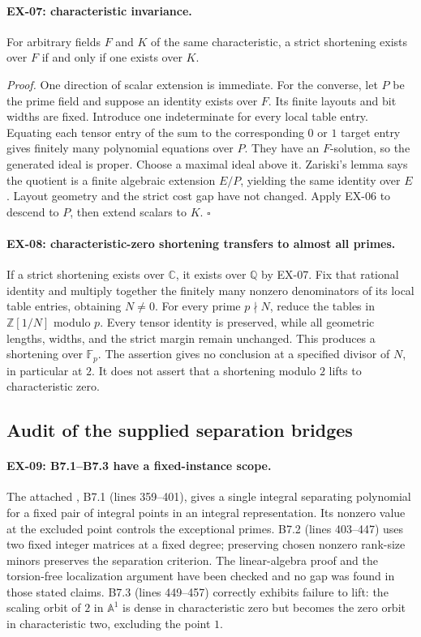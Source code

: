 \paragraph{EX-07: characteristic invariance.}
For arbitrary fields $F$ and $K$ of the same characteristic, a strict shortening
exists over $F$ if and only if one exists over $K$.

\emph{Proof.}
One direction of scalar extension is immediate.  For the converse, let $P$ be
the prime field and suppose an identity exists over $F$.  Its finite layouts
and bit widths are fixed.  Introduce one indeterminate for every local table
entry.  Equating each tensor entry of the sum to the corresponding $0$ or $1$
target entry gives finitely many polynomial equations over $P$.  They have an
$F$-solution, so the generated ideal is proper.  Choose a maximal ideal above
it.  Zariski's lemma says the quotient is a finite algebraic extension $E/P$,
yielding the same identity over $E$.  Layout geometry and the strict cost gap
have not changed.  Apply EX-06 to descend to $P$, then extend scalars to $K$.
\hfill$\square$

\paragraph{EX-08: characteristic-zero shortening transfers to almost all
primes.}
If a strict shortening exists over $\mathbb C$, it exists over $\mathbb Q$ by
EX-07.  Fix that rational identity and multiply together the finitely many
nonzero denominators of its local table entries, obtaining $N\neq0$.
For every prime $p\nmid N$, reduce the tables in $\mathbb Z[1/N]$ modulo $p$.
Every tensor identity is preserved, while all geometric lengths, widths, and
the strict margin remain unchanged.  This produces a shortening over
$\mathbb F_p$.  The assertion gives no conclusion at a specified divisor of
$N$, in particular at $2$.  It does not assert that a shortening modulo $2$
lifts to characteristic zero.

\subsection{Audit of the supplied separation bridges}
\label{sec:ex-bridges}

\paragraph{EX-09: B7.1--B7.3 have a fixed-instance scope.}
The attached , B7.1 (lines 359--401), gives a
single integral separating polynomial for a fixed pair of integral points in
an integral representation.  Its nonzero value at the excluded point controls
the exceptional primes.  B7.2 (lines 403--447) uses two fixed integer matrices
at a fixed degree; preserving chosen nonzero rank-size minors preserves the
separation criterion.  The linear-algebra proof and the torsion-free
localization argument have been checked and no gap was found in those stated
claims.  B7.3 (lines 449--457) correctly exhibits failure to lift: the scaling
orbit of $2$ in $\mathbb A^1$ is dense in characteristic zero but becomes the
zero orbit in characteristic two, excluding the point $1$.

